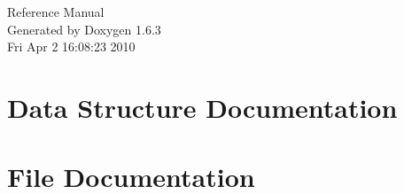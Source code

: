 \documentclass[a4paper]{article}
\begin{document}
\hypersetup{pageanchor=false}
\begin{titlepage}
\vspace*{7cm}
\begin{center}
{\Large Reference Manual}\\
\vspace*{1cm}
{\large Generated by Doxygen 1.6.3}\\
\vspace*{0.5cm}
{\small Fri Apr 2 16:08:23 2010}\\
\end{center}
\end{titlepage}
\tableofcontents
{}
\hypersetup{pageanchor=true}
\section{Data Structure Documentation}












\section{File Documentation}





\printindex
\end{document}
